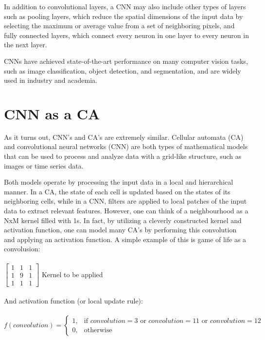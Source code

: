\documentclass{article}
\begin{document}
	In addition to convolutional layers, a CNN may also include other types of layers such as pooling layers, which reduce the spatial dimensions of the input data by selecting the maximum or average value from a set of neighboring pixels, and fully connected layers, which connect every neuron in one layer to every neuron in the next layer.
	
	CNNs have achieved state-of-the-art performance on many computer vision tasks, such as image classification, object detection, and segmentation, and are widely used in industry and academia.

\section{CNN as a CA}
	As it turns out, CNN's and CA's are extremely similar. Cellular automata (CA) and convolutional neural networks (CNN) are both types of mathematical models that can be used to process and analyze data with a grid-like structure, such as images or time series data. \cite{PhysRevE.100.032402}
	
	Both models operate by processing the input data in a local and hierarchical manner. In a CA, the state of each cell is updated based on the states of its neighboring cells, while in a CNN, filters are applied to local patches of the input data to extract relevant features. However, one can think of a neighbourhood as a NxM kernel filled with 1s. In fact, by utilizing a cleverly constructed kernel and activation function, one can model many CA's by performing this convolution and applying an activation function. A simple example of this is game of life as a convolusion: \\ \\
	$
	\begin{bmatrix}
		1 & 1 & 1 \\
		1 & 9 & 1 \\
		1 & 1 & 1
	\end{bmatrix}
	$
	Kernel to be applied \\ \\
	And activation function (or local update rule): \\ \\
	$
	f(convolution) = \begin{cases}
	1, & \text{if } convolution = 3 \text{ or } convolution = 11 \text{ or } convolution = 12 \\
	0, & \text{otherwise}
	\end{cases}
	$ \\ \\
	
\end{document}
